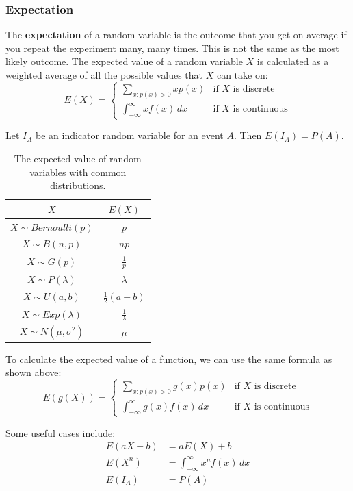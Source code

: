 \documentclass[12pt]{article}
\begin{document}
\subsubsection{Expectation}
The \textbf{expectation} of a random variable is the outcome that you get on average if you repeat the experiment many, many times.
This is not the same as the most likely outcome.
The expected value of a random variable $X$ is calculated as a weighted average of all the possible values that $X$ can take on:
\[ E(X) = \begin{cases}
    \displaystyle \sum_{x:p(x)>0} xp(x) & \text{if } X \text{ is discrete} \\
    \displaystyle \int_{-\infty}^{\infty} xf(x) \,dx & \text{if } X \text{ is continuous}
\end{cases} \]

\noindent
Let $I_A$ be an indicator random variable for an event $A$.
Then $E(I_A) = P(A)$.

\begin{table}[h]
    \centering
    \begin{tabular}{c|c}
    $X$                       & $E(X)$               \\ \hline
    $X \sim Bernoulli(p)$     & $p$                  \\
    $X \sim B(n, p)$          & $np$                 \\
    $X \sim G(p)$             & $\frac{1}{p}$        \\
    $X \sim P(\lambda)$       & $\lambda$            \\
    $X \sim U(a, b)$          & $\frac{1}{2}(a + b)$ \\
    $X \sim Exp(\lambda)$     & $\frac{1}{\lambda}$  \\
    $X \sim N(\mu, \sigma^2)$ & $\mu$               
    \end{tabular}
    \caption{The expected value of random variables with common distributions.}
\end{table}

\newpage
\noindent
To calculate the expected value of a function, we can use the same formula as shown above:
\[ E(g(X)) = \begin{cases}
    \displaystyle \sum_{x:p(x)>0} g(x)p(x) & \text{if } X \text{ is discrete} \\
    \displaystyle \int_{-\infty}^{\infty} g(x)f(x) \,dx & \text{if } X \text{ is continuous}
\end{cases} \]

\noindent
Some useful cases include:
\begin{align*}
    E(aX + b) & = aE(X) + b \\
    E(X^n) & = \int_{-\infty}^{\infty} x^n f(x) \,dx \\
    E(I_A) & = P(A)
\end{align*}
\end{document}
